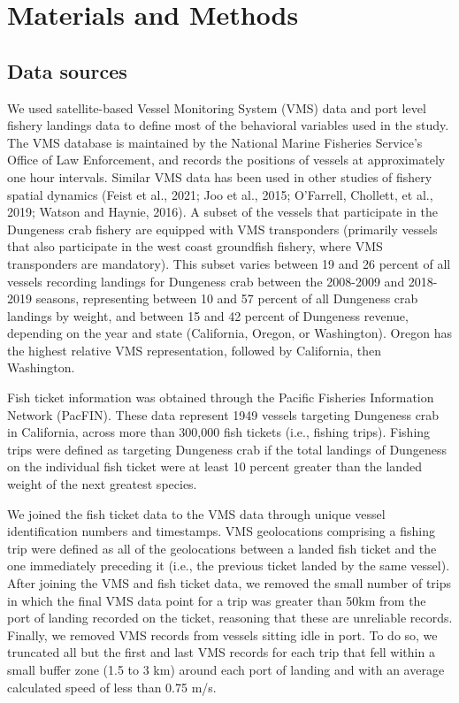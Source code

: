 \documentclass[]{elsarticle} %
\begin{document}
\hypertarget{methods}{%
\section{Materials and Methods}\label{methods}}

\hypertarget{data-sources}{%
\subsection{Data sources}\label{data-sources}}

We used satellite-based Vessel Monitoring System (VMS) data and port
level fishery landings data to define most of the behavioral variables
used in the study. The VMS database is maintained by the National Marine
Fisheries Service's Office of Law Enforcement, and records the positions
of vessels at approximately one hour intervals. Similar VMS data has
been used in other studies of fishery spatial dynamics (Feist et al.,
2021; Joo et al., 2015; O'Farrell, Chollett, et al., 2019; Watson and
Haynie, 2016). A subset of the vessels that participate in the Dungeness
crab fishery are equipped with VMS transponders (primarily vessels that
also participate in the west coast groundfish fishery, where VMS
transponders are mandatory). This subset varies between 19 and 26
percent of all vessels recording landings for Dungeness crab between the
2008-2009 and 2018-2019 seasons, representing between 10 and 57 percent
of all Dungeness crab landings by weight, and between 15 and 42 percent
of Dungeness revenue, depending on the year and state (California,
Oregon, or Washington). Oregon has the highest relative VMS
representation, followed by California, then Washington.

Fish ticket information was obtained through the Pacific Fisheries
Information Network (PacFIN). These data represent 1949 vessels
targeting Dungeness crab in California, across more than 300,000 fish
tickets (i.e., fishing trips). Fishing trips were defined as targeting
Dungeness crab if the total landings of Dungeness on the individual fish
ticket were at least 10 percent greater than the landed weight of the
next greatest species.

We joined the fish ticket data to the VMS data through unique vessel
identification numbers and timestamps. VMS geolocations comprising a
fishing trip were defined as all of the geolocations between a landed
fish ticket and the one immediately preceding it (i.e., the previous
ticket landed by the same vessel). After joining the VMS and fish ticket
data, we removed the small number of trips in which the final VMS data
point for a trip was greater than 50km from the port of landing recorded
on the ticket, reasoning that these are unreliable records. Finally, we
removed VMS records from vessels sitting idle in port. To do so, we
truncated all but the first and last VMS records for each trip that fell
within a small buffer zone (1.5 to 3 km) around each port of landing and
with an average calculated speed of less than 0.75 m/s.
\end{document}

